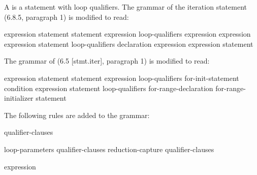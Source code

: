 
\pnum
A
is a
statement with loop qualifiers.
The grammar of the iteration statement (6.8.5, paragraph 1)
is modified to read:

\begin{bnf}
\br
{} \terminal{(} expression \terminal{)} statement
\br
{} statement  \terminal{(} expression \terminal{)} \terminal{;}
\br
loop-qualifiers\opt{}  \terminal{(}
expression\opt{} \terminal{;}
expression\opt{} \terminal{;}
expression\opt{} \terminal{)} statement
\br
loop-qualifiers\opt{}  \terminal{(}
declaration
expression\opt{} \terminal{;}
expression\opt{} \terminal{)} statement
\end{bnf}

\begin{cpp}
The grammar of
(6.5 [stmt.iter], paragraph 1)
is modified to read:

\begin{bnf}
\br
{} \terminal{(} expression \terminal{)} statement
\br
{} statement  \terminal{(} expression \terminal{)} \terminal{;}
\br
loop-qualifiers\opt{}  \terminal{(}
for-init-statement
condition\opt{} \terminal{;}
expression\opt{} \terminal{)} statement
\br
loop-qualifiers\opt{}  \terminal{(}
for-range-declaration \terminal{:}
for-range-initializer \terminal{)} statement
\end{bnf}

\end{cpp}

\pnum
The following rules are added to the grammar:

\begin{bnf}
\br
{} qualifier-clauses\opt
\end{bnf}

\begin{bnf}
\br
loop-parameters qualifier-clauses\opt
\br
reduction-capture qualifier-clauses\opt
\end{bnf}

\begin{bnf}
\br
{} \terminal{(} expression \terminal{)}
\end{bnf}

